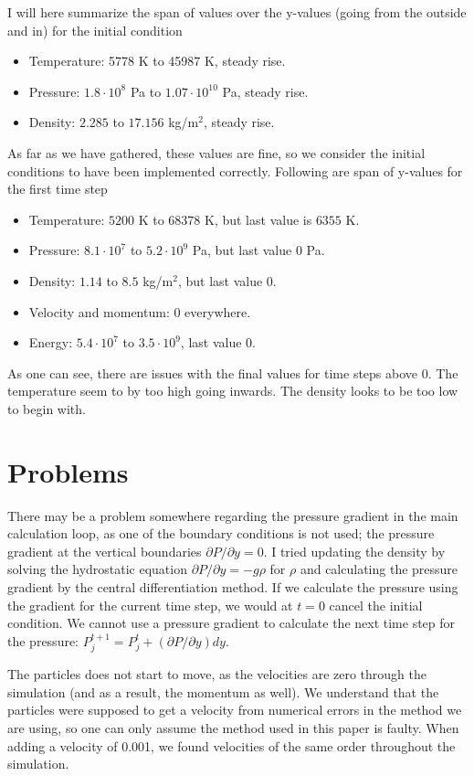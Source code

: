 \documentclass[a4paper,10pt]{article}
\begin{document}
I will here summarize the span of values over the y-values (going from the outside and in) for the initial condition
\begin{itemize}
\item Temperature: 5778 K to 45987 K, steady rise.
\item Pressure: $1.8 \cdot 10^8$ Pa to $1.07 \cdot 10^{10}$ Pa, steady rise.
\item Density: $2.285$ to $17.156$ kg/m$^2$, steady rise.
\end{itemize}

As far as we have gathered, these values are fine, so we consider the initial conditions to have been implemented correctly. Following are span of y-values for the first time step
\begin{itemize}
\item Temperature: $5200$ K to $68378$ K, but last value is $6355$ K.
\item Pressure: $8.1 \cdot 10^7$ to $5.2 \cdot 10^9$ Pa, but last value 0 Pa.
\item Density: $1.14$ to $8.5$ kg/m$^2$, but last value 0.
\item Velocity and momentum: 0 everywhere.
\item Energy: $5.4\cdot 10^7$ to $3.5 \cdot 10^9$, last value 0.
\end{itemize}

As one can see, there are issues with the final values for time steps above 0. The temperature seem to by too high going inwards. The density looks to be too low to begin with.

\section{Problems}
There may be a problem somewhere regarding the pressure gradient in the main calculation loop, as one of the boundary conditions is not used; the pressure gradient at the vertical boundaries $\partial P /\partial y = 0$. I tried updating the density by solving the hydrostatic equation $\partial P/\partial y = -g\rho$ for $\rho$ and calculating the pressure gradient by the central differentiation method. If we calculate the pressure using the gradient for the current time step, we would at $t=0$ cancel the initial condition. We cannot use a pressure gradient to calculate the next time step for the pressure: $P_j^{t+1} = P_j^t + (\partial P/\partial y)dy$.

The particles does not start to move, as the velocities are zero through the simulation (and as a result, the momentum as well). We understand that the particles were supposed to get a velocity from numerical errors in the method we are using, so one can only assume the method used in this paper is faulty. When adding a velocity of 0.001, we found velocities of the same order throughout the simulation.
\end{document}
